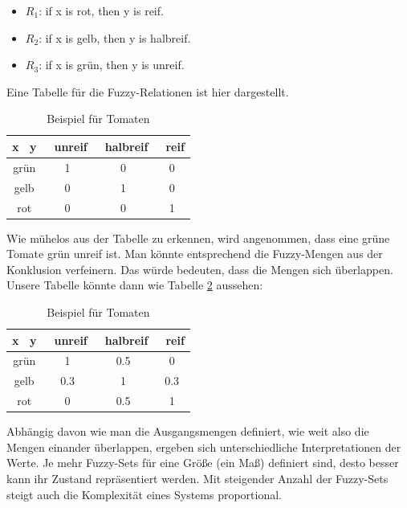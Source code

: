 \begin{itemize}
	\item $R_1$: if x is rot, then y is reif.
	\item $R_2$: if x is gelb, then y is halbreif.
	\item $R_3$: if x is grün, then y is unreif.
\end{itemize}

Eine Tabelle für die Fuzzy-Relationen ist hier dargestellt.

\begin{table}\label{tomato:1}
	\centering
	\begin{tabular}{c|c c c}
		
		x \diagdown \ y & \ unreif & \ halbreif & \ reif \\ [0.5ex]
		\hline
		grün & 1 & 0 & 0 \\ 
		gelb & 0 & 1 & 0\\
		rot  & 0 & 0 & 1\\
		
	\end{tabular}
	\caption{Beispiel für Tomaten}
	
\end{table}

Wie mühelos aus der Tabelle zu erkennen, wird angenommen, dass eine grüne Tomate grün unreif ist. Man könnte entsprechend die Fuzzy-Mengen aus der Konklusion verfeinern. Das würde bedeuten, dass die Mengen sich überlappen. Unsere Tabelle könnte dann wie Tabelle \ref{table:1} aussehen:

\begin{table}
	\centering
	\begin{tabular}{c|c c c}
		
		x \diagdown \ y & \ unreif & \ halbreif & \ reif \\ [0.5ex]
		\hline
		grün & 1 & 0.5 & 0 \\ 
		gelb & 0.3 & 1 & 0.3\\
		rot  & 0 & 0.5 & 1\\
		
	\end{tabular}
	\caption{Beispiel für Tomaten}
	\label{table:1}
\end{table}

Abhängig davon wie man die Ausgangsmengen definiert, wie weit also die Mengen einander überlappen, ergeben sich unterschiedliche Interpretationen der Werte. Je mehr Fuzzy-Sets für eine Größe (ein Maß) definiert sind, desto besser kann ihr Zustand repräsentiert werden. Mit steigender Anzahl der Fuzzy-Sets steigt auch die Komplexität eines Systems proportional.

